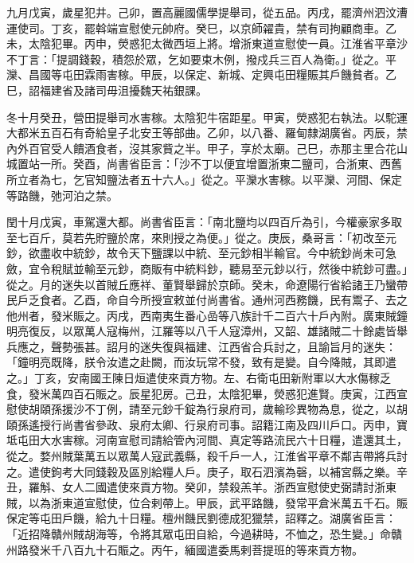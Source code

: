 \begin{pinyinscope}
 九月戊寅，歲星犯井。己卯，置高麗國儒學提舉司，從五品。丙戌，罷濟州泗汶漕運使司。丁亥，罷斡端宣慰使元帥府。癸巳，以京師糴貴，禁有司拘顧商車。乙未，太陰犯畢。丙申，熒惑犯太微西垣上將。增浙東道宣慰使一員。江淮省平章沙不丁言：「提調錢穀，積怨於眾，乞如要束木例，撥戍兵三百人為衛。」從之。平灤、昌國等屯田霖雨害稼。甲辰，以保定、新城、定興屯田糧賑其戶饑貧者。乙巳，詔福建省及諸司毋沮擾魏天祐銀課。



 冬十月癸丑，營田提舉司水害稼。太陰犯牛宿距星。甲寅，熒惑犯右執法。以駝運大都米五百石有奇給皇子北安王等部曲。乙卯，以八番、羅甸隸湖廣省。丙辰，禁內外百官受人饋酒食者，沒其家貲之半。甲子，享於太廟。己巳，赤那主里合花山城置站一所。癸酉，尚書省臣言：「沙不丁以便宜增置浙東二鹽司，合浙東、西舊所立者為七，乞官知鹽法者五十六人。」從之。平灤水害稼。以平灤、河間、保定等路饑，弛河泊之禁。



 閏十月戊寅，車駕還大都。尚書省臣言：「南北鹽均以四百斤為引，今權豪家多取至七百斤，莫若先貯鹽於席，來則授之為便。」從之。庚辰，桑哥言：「初改至元鈔，欲盡收中統鈔，故令天下鹽課以中統、至元鈔相半輸官。今中統鈔尚未可急斂，宜令稅賦並輸至元鈔，商販有中統料鈔，聽易至元鈔以行，然後中統鈔可盡。」從之。月的迷失以首賊丘應祥、董賢舉歸於京師。癸未，命遼陽行省給諸王乃蠻帶民戶乏食者。乙酉，命自今所授宣敕並付尚書省。通州河西務饑，民有鬻子、去之他州者，發米賑之。丙戌，西南夷生番心嵒等八族計千二百六十戶內附。廣東賊鐘明亮復反，以眾萬人寇梅州，江羅等以八千人寇漳州，又韶、雄諸賊二十餘處皆舉兵應之，聲勢張甚。詔月的迷失復與福建、江西省合兵討之，且諭旨月的迷失：「鐘明亮既降，朕令汝遣之赴闕，而汝玩常不發，致有是變。自今降賊，其即遣之。」丁亥，安南國王陳日烜遣使來貢方物。左、右衛屯田新附軍以大水傷稼乏食，發米萬四百石賑之。辰星犯房。己丑，太陰犯畢，熒惑犯進賢。庚寅，江西宣慰使胡頤孫援沙不丁例，請至元鈔千錠為行泉府司，歲輸珍異物為息，從之，以胡頤孫遙授行尚書省參政、泉府太卿、行泉府司事。詔籍江南及四川戶口。丙申，寶坻屯田大水害稼。河南宣慰司請給管內河間、真定等路流民六十日糧，遣還其土，從之。婺州賊葉萬五以眾萬人寇武義縣，殺千戶一人，江淮省平章不鄰吉帶將兵討之。遣使鉤考大同錢穀及區別給糧人戶。庚子，取石泗濱為磬，以補宮縣之樂。辛丑，羅斛、女人二國遣使來貢方物。癸卯，禁殺羔羊。浙西宣慰使史弼請討浙東賊，以為浙東道宣慰使，位合剌帶上。甲辰，武平路饑，發常平倉米萬五千石。賑保定等屯田戶饑，給九十日糧。檀州饑民劉德成犯獵禁，詔釋之。湖廣省臣言：「近招降贛州賊胡海等，令將其眾屯田自給，今過耕時，不恤之，恐生變。」命贛州路發米千八百九十石賑之。丙午，緬國遣委馬剌菩提班的等來貢方物。




\end{pinyinscope}
